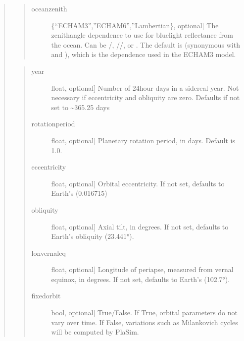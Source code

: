 \documentclass[letterpaper,10pt,english]{sphinxmanual}
\begin{document}
\begin{fulllineitems}
\begin{fulllineitems}
\begin{quote}
\begin{quote}
\begin{description}
\item[{oceanzenith}] \leavevmode{[}\{“ECHAM\sphinxhyphen{}3”,”ECHAM\sphinxhyphen{}6”,”Lambertian\}, optional{]}
The zenith\sphinxhyphen{}angle dependence to use for blue\sphinxhyphen{}light reflectance from the ocean.
Can be /, //, or .
The default is  (synonymous with  and ), which is
the dependence used in the ECHAM\sphinxhyphen{}3 model.

\end{description}
\end{quote}

\begin{quote}
\begin{description}
\item[{year}] \leavevmode{[}float, optional{]}
Number of 24\sphinxhyphen{}hour days in a sidereal year. Not necessary if eccentricity and
obliquity are zero. Defaults if not set to \textasciitilde{}365.25 days

\item[{rotationperiod}] \leavevmode{[}float, optional{]}
Planetary rotation period, in days. Default is 1.0.

\item[{eccentricity}] \leavevmode{[}float, optional{]}
Orbital eccentricity. If not set, defaults to Earth’s (0.016715)

\item[{obliquity}] \leavevmode{[}float, optional{]}
Axial tilt, in degrees. If not set, defaults to Earth’s obliquity (23.441°).

\item[{lonvernaleq}] \leavevmode{[}float, optional{]}
Longitude of periapse, measured from vernal equinox, in degrees. If
not set, defaults to Earth’s (102.7°).

\item[{fixedorbit}] \leavevmode{[}bool, optional{]}
True/False. If True, orbital parameters do not vary over time. If False,
variations such as Milankovich cycles will be computed by PlaSim.


\end{description}
\end{quote}
\end{quote}
\end{fulllineitems}
\end{fulllineitems}
\end{document}
